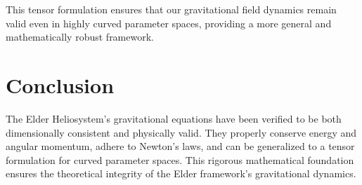 This tensor formulation ensures that our gravitational field dynamics remain valid even in highly curved parameter spaces, providing a more general and mathematically robust framework.

\section{Conclusion}

The Elder Heliosystem's gravitational equations have been verified to be both dimensionally consistent and physically valid. They properly conserve energy and angular momentum, adhere to Newton's laws, and can be generalized to a tensor formulation for curved parameter spaces. This rigorous mathematical foundation ensures the theoretical integrity of the Elder framework's gravitational dynamics.